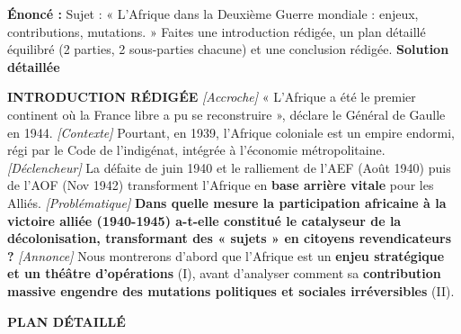 \documentclass[11pt]{article}
\begin{document}
\begin{exoresolu}
\textbf{Énoncé :} Sujet : « L'Afrique dans la Deuxième Guerre mondiale : enjeux, contributions, mutations. » Faites une introduction rédigée, un plan détaillé équilibré (2 parties, 2 sous-parties chacune) et une conclusion rédigée.
\tcblower
\textbf{Solution détaillée}

\textbf{INTRODUCTION RÉDIGÉE}
\textit{[Accroche]} « L'Afrique a été le premier continent où la France libre a pu se reconstruire », déclare le Général de Gaulle en 1944. \textit{[Contexte]} Pourtant, en 1939, l'Afrique coloniale est un empire endormi, régi par le Code de l'indigénat, intégrée à l'économie métropolitaine. \textit{[Déclencheur]} La défaite de juin 1940 et le ralliement de l'AEF (Août 1940) puis de l'AOF (Nov 1942) transforment l'Afrique en \textbf{base arrière vitale} pour les Alliés. \textit{[Problématique]} \textbf{Dans quelle mesure la participation africaine à la victoire alliée (1940-1945) a-t-elle constitué le catalyseur de la décolonisation, transformant des « sujets » en citoyens revendicateurs ?} \textit{[Annonce]} Nous montrerons d'abord que l'Afrique est un \textbf{enjeu stratégique et un théâtre d'opérations} (I), avant d'analyser comment sa \textbf{contribution massive engendre des mutations politiques et sociales irréversibles} (II).

\textbf{PLAN DÉTAILLÉ}


\end{exoresolu}
\end{document}
